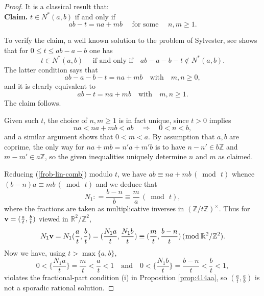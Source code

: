 \documentclass[12pt,letterpaper, reqno]{amsart}
\theoremstyle{definition}
\theoremstyle{remark}
\newcommand{\RR}{\ensuremath{\mathbb{R}}}
\newcommand{\ZZ}{\ensuremath{\mathbb{Z}}}
\newcommand{\bv}{{\bf v}}
\begin{document}
\begin{proof}
It is a classical result that:\\

{\bf Claim.} $ t \in N^{\ast}(a,b) $ if and only if
\begin{equation}\label{frob-lin-comb}
ab-t = na + mb \quad \text{ for some } \quad n,m\geq 1.
\end{equation}

To verify the claim, a well known solution to the problem of Sylvester, see \cite[pp. 103--105]{RA05}  shows that
for $0 \le t \le ab-a-b$ one has
\[
  t \in N^{\ast}(a, b) \quad \mbox{ if and only if}\quad  ab-a -b -t \not\in N^{\ast}(a, b).
\]
The latter condition says that 
$$
ab-a-b-t= na+ mb \quad \mbox{with} \quad  m, n \ge 0,
$$
and it  is clearly equivalent to 
$$
ab-t= na+ mb \quad \mbox{with} \quad  m, n \ge 1.
$$
The claim follows. 



Given such $t$, the choice of $n,m \ge 1$ is in fact unique, since $t>0$ implies
\[ 
na < na+mb < ab \quad\Rightarrow\quad 0< n < b,
\]
and a similar argument shows that
 $0<m < a$. 
 By assumption that $a,b$ are coprime, the only way for $na + mb = n'a + m'b$ is to have  $n-n' \in b\ZZ$ and $m-m'\in a\ZZ$, 
 so the given inequalities uniquely determine $n$ and $m$ as claimed.

Reducing (\ref{frob-lin-comb}) modulo $t$, we have
$ 
ab \equiv na + mb \,(\bmod\, t )
$
whence 
$
(b-n)a \equiv mb \, (\bmod \, t) 
$
and we deduce that 
 $$
 N_1: = \frac{b-n}{b} \equiv \frac{m}{a}  \, (\bmod \,t),
 $$
where the fractions are taken as  multiplicative inverses in $(\ZZ/t\ZZ)^\times$. Thus for $\bv =(\frac{a}{t}, \frac{b}{t})$
viewed in $\RR^2/\ZZ^2$, 
\[ 
N_1 \bv = N_1(\frac{a}{t},\frac{b}{t}) = (\frac{N_1a}{t}, \frac{N_1b}{t}) \equiv  (\frac{m}{t}, \frac{b-n}{t}) \, (\bmod \, \RR^2/\ZZ^2).
\]
Now we have, using $t > \max \{ a, b\}$, 
\[ 
0< \{\frac{N_1a}{t} \} = \frac{m}{t} < \frac{a}{t} < 1 \quad\text{and}\quad 0< \{\frac{N_1b}{t}\} = \frac{b-n}{t }< \frac{b}{t} <1,
\]
 violates the fractional-part condition (i)  in Proposition \ref{prop:414aa}, so $(\frac{a}{t}, \frac{a}{b})$ is not a sporadic rational solution. 
\end{proof}
\end{document}
